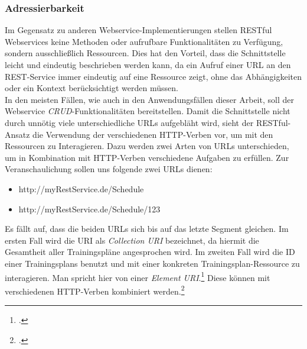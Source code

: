 \subsubsection*{Adressierbarkeit}
Im Gegensatz zu anderen Webservice-Implementierungen stellen \ac{REST}ful Webservices keine Methoden oder aufrufbare Funktionalitäten zu Verfügung, sondern ausschließlich Ressourcen. Dies hat den Vorteil, dass die Schnittstelle leicht und eindeutig beschrieben werden kann, da ein Aufruf einer \ac{URL} an den \ac{REST}-Service immer eindeutig auf eine Ressource zeigt, ohne das Abhängigkeiten oder ein Kontext berücksichtigt werden müssen. \\
In den meisten Fällen, wie auch in den Anwendungsfällen dieser Arbeit, soll der Webservice \textit{\ac{CRUD}}-Funktionalitäten bereitstellen. Damit die Schnittstelle nicht durch unnötig viele unterschiedliche \ac{URL}s aufgebläht wird, sieht der \ac{REST}ful-Ansatz die Verwendung der verschiedenen \ac{HTTP}-Verben vor, um mit den Ressourcen zu Interagieren. Dazu werden zwei Arten von \ac{URL}s unterschieden, um in Kombination mit \ac{HTTP}-Verben verschiedene Aufgaben zu erfüllen. Zur Veranschaulichung sollen uns folgende zwei \ac{URL}s dienen:
\begin{itemize}
\item http://myRestService.de/Schedule
\item http://myRestService.de/Schedule/123
\end{itemize}
Es fällt auf, dass die beiden \ac{URL}s sich bis auf das letzte Segment gleichen. Im ersten Fall wird die \ac{URI} als \textit{Collection \ac{URI}} bezeichnet, da hiermit die Gesamtheit aller Trainingspläne angesprochen wird. Im zweiten Fall wird die ID einer Trainingsplans benutzt und mit einer konkreten Trainingsplan-Ressource zu interagieren. Man spricht hier von einer \textit{Element \ac{URI}}.\footcite[S. 12ff.]{Building-a-REST-Service} Diese können mit verschiedenen \ac{HTTP}-Verben kombiniert werden.\footcite[S. 26ff.]{REST-und-HTTP}
